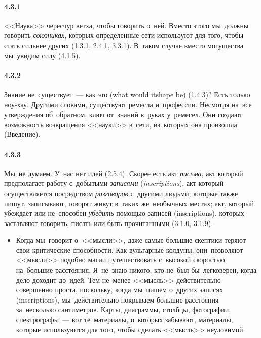 \paragraph{4.3.1}\hypertarget{par:4.3.1}{} <<Наука>> чересчур ветха, чтобы говорить о~ней. Вместо этого мы~должны говорить {\itshape союзниках}, которых определенные сети используют для того, чтобы стать сильнее других (\hyperlink{par:1.3.1}{1.3.1}, \hyperlink{par:2.4.1}{2.4.1}, \hyperlink{par:3.3.1}{3.3.1}). В~таком случае вместо могущества мы~увидим силу (\hyperlink{par:4.1.5}{4.1.5}).


\paragraph{4.3.2}\hypertarget{par:4.3.2}{} Знание не~существует~--- как это (what would itshape be) (\hyperlink{par:1.4.3}{1.4.3})? Есть только ноу-хау. Другими словами, существуют ремесла и~профессии. Несмотря на~все утверждения об~обратном, ключ от~знаний в~руках у~ремесел. Они создают возможность возвращения <<науки>> в~сети, из~которых она произошла (Введение).


\paragraph{4.3.3}\hypertarget{par:4.3.3}{} Мы~не думаем. У~нас нет идей (\hyperlink{par:2.5.4}{2.5.4}). Скорее есть акт {\itshape письма}, акт который предполагает работу с~добытыми {\itshape записями} ({\itshape inscriptions}), акт который осуществляется посредством {\itshape разговоров} с~другими людьми, которые также пишут, записывают, говорят живут в~таких же~необычных местах; акт, который убеждает или не~способен {\itshape убедить} помощью записей (inscriptions), которых заставляют говорить, писать или быть прочитанными (\hyperlink{par:3.1.0}{3.1.0}, \hyperlink{par:3.1.9}{3.1.9}). 
	\begin{itemize}
	\item 
	Когда мы~говорит о~<<мысли>>, даже самые большие скептики теряют свои критические способности. Как вульгарные колдуны, они~позволяют <<мысли>> подобно магии путешествовать с~высокой скоростью на~большие расстояния. Я~не~знаю никого, кто не~был бы~легковерен, когда дело доходит до~идей. Тем не~менее <<мысль>> действительно совершенно проста, поскольку, когда мы~пишем о~других записях (inscriptions), мы~действительно покрываем большие расстояния за~несколько сантиметров. Карты, диаграммы, столбцы, фотографии, спектрографы~--- вот те~материалы, о~которых забывают, материалы, которые используются для того, чтобы сделать <<мысль>> неуловимой.
	\end{itemize}


